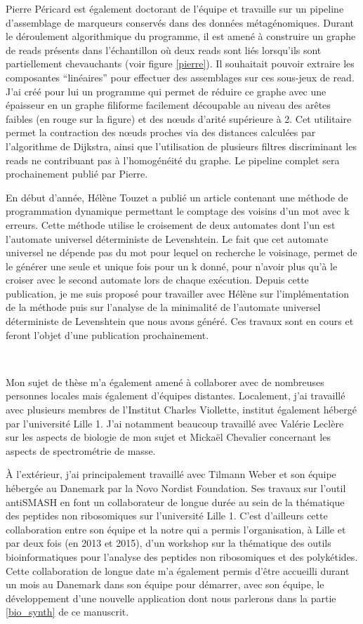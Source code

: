 Pierre Péricard est également doctorant de l'équipe et travaille sur un pipeline d'assemblage de marqueurs conservés dans des données métagénomiques.
Durant le déroulement algorithmique du programme, il est amené à construire un graphe de reads présents dans l'échantillon où deux reads sont liés lorsqu'ils sont partiellement chevauchants (voir figure \ref{pierre}).
Il souhaitait pouvoir extraire les composantes ``linéaires'' pour effectuer des assemblages sur ces sous-jeux de read.
J'ai créé pour lui un programme qui permet de réduire ce graphe avec une épaisseur en un graphe filiforme facilement découpable au niveau des arêtes faibles (en rouge sur la figure) et des n\oe{}uds d'arité supérieure à 2.
Cet utilitaire permet la contraction des n\oe{}uds proches via des distances calculées par l'algorithme de Dijkstra, ainsi que l'utilisation de plusieurs filtres discriminant les reads ne contribuant pas à l'homogénéité du graphe.
Le pipeline complet sera prochainement publié par Pierre.

En début d'année, Hélène Touzet a publié un article contenant une méthode de programmation dynamique permettant le comptage des voisins d'un mot avec k erreurs.
Cette méthode utilise le croisement de deux automates dont l'un est l'automate universel déterministe de Levenshtein.
Le fait que cet automate universel ne dépende pas du mot pour lequel on recherche le voisinage, permet de le générer une seule et unique fois pour un k donné, pour n'avoir plus qu'à le croiser avec le second automate lors de chaque exécution.
Depuis cette publication, je me suis proposé pour travailler avec Hélène sur l'implémentation de la méthode puis sur l'analyse de la minimalité de l'automate universel déterministe de Levenshtein que nous avons généré.
Ces travaux sont en cours et feront l'objet d'une publication prochainement.

~~

Mon sujet de thèse m'a également amené à collaborer avec de nombreuses personnes locales mais également d'équipes distantes.
Localement, j'ai travaillé avec plusieurs membres de l'Institut Charles Viollette, institut également hébergé par l'université Lille 1.
J'ai notamment beaucoup travaillé avec Valérie Leclère sur les aspects de biologie de mon sujet et Mickaël Chevalier concernant les aspects de spectrométrie de masse.

À l'extérieur, j'ai principalement travaillé avec Tilmann Weber et son équipe hébergée au Danemark par la Novo Nordist Foundation.
Ses travaux sur l'outil antiSMASH en font un collaborateur de longue durée au sein de la thématique des peptides non ribosomiques sur l'université Lille 1.
C'est d'ailleurs cette collaboration entre son équipe et la notre qui a permis l'organisation, à Lille et par deux fois (en 2013 et 2015), d'un workshop sur la thématique des outils bioinformatiques pour l'analyse des peptides non ribosomiques et des polykétides.
Cette collaboration de longue date m'a également permis d'être accueilli durant un mois au Danemark dans son équipe pour démarrer, avec son équipe, le développement d'une nouvelle application dont nous parlerons dans la partie \ref{bio_synth} de ce manuscrit.

